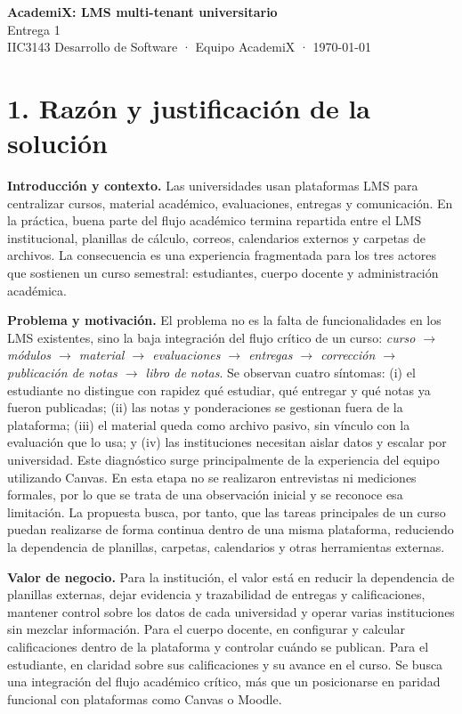 \documentclass[letterpaper,10pt]{article}
\begin{document}
\begin{center}
{\LARGE\bfseries\color{navy} AcademiX: LMS multi-tenant universitario}\\
{\large Entrega 1}\\
IIC3143 Desarrollo de Software · Equipo AcademiX · \today
\end{center}

\section{1. Razón y justificación de la solución}

\textbf{Introducción y contexto.} Las universidades usan plataformas LMS para centralizar cursos, material académico, evaluaciones, entregas y comunicación. En la práctica, buena parte del flujo académico termina repartida entre el LMS institucional, planillas de cálculo, correos, calendarios externos y carpetas de archivos. La consecuencia es una experiencia fragmentada para los tres actores que sostienen un curso semestral: estudiantes, cuerpo docente y administración académica.

\textbf{Problema y motivación.} El problema no es la falta de funcionalidades en los LMS existentes, sino la baja integración del flujo crítico de un curso: \emph{curso $\rightarrow$ módulos $\rightarrow$ material $\rightarrow$ evaluaciones $\rightarrow$ entregas $\rightarrow$ corrección $\rightarrow$ publicación de notas $\rightarrow$ libro de notas}. Se observan cuatro síntomas: (i) el estudiante no distingue con rapidez qué estudiar, qué entregar y qué notas ya fueron publicadas; (ii) las notas y ponderaciones se gestionan fuera de la plataforma; (iii) el material queda como archivo pasivo, sin vínculo con la evaluación que lo usa; y (iv) las instituciones necesitan aislar datos y escalar por universidad. Este diagnóstico surge principalmente de la experiencia del equipo utilizando Canvas. En esta etapa no se realizaron entrevistas ni mediciones formales, por lo que se trata de una observación inicial y se reconoce esa limitación. La propuesta busca, por tanto, que las tareas principales de un curso puedan realizarse de forma continua dentro de una misma plataforma, reduciendo la dependencia de planillas, carpetas, calendarios y otras herramientas externas.

\textbf{Valor de negocio.} Para la institución, el valor está en reducir la dependencia de planillas externas, dejar evidencia y trazabilidad de entregas y calificaciones, mantener control sobre los datos de cada universidad y operar varias instituciones sin mezclar información. Para el cuerpo docente, en configurar y calcular calificaciones dentro de la plataforma y controlar cuándo se publican. Para el estudiante, en claridad sobre sus calificaciones y su avance en el curso. Se busca una integración del flujo académico crítico, más que un posicionarse en paridad funcional con plataformas como Canvas o Moodle.
\end{document}
